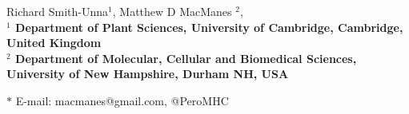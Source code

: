 \documentclass[11pt]{article}
\begin{document}
Richard Smith-Unna$^{1}$, 
Matthew D MacManes $^{2}$, 
\\


\bf{$^{1}$} Department of Plant Sciences, University of Cambridge, Cambridge, United Kingdom \\
\bf{$^{2}$} Department of Molecular, Cellular and Biomedical Sciences, University of New Hampshire, Durham NH, USA


$\ast$ E-mail: macmanes@gmail.com, @PeroMHC
\end{document}
